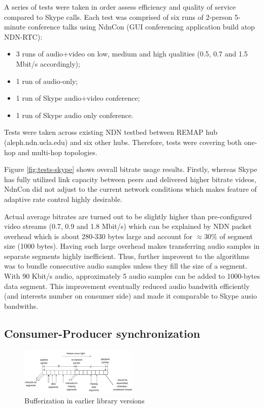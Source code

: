 \documentclass{icn/sig-alternate-2012} %
\newcommand{\ndnrtcName}{NDN-RTC} %
\begin{document}
A series of tests were taken in order assess efficiency and quality of service compared to Skype calls. Each test was comprised of six runs of 2-person 5-minute conference talks using NdnCon (GUI conferencing application build atop \ndnrtcName{}):
\begin{itemize}
\item 3 runs of audio+video on low, medium and high qualities (0.5, 0.7 and 1.5 Mbit/s accordingly);
\item 1 run of audio-only;
\item 1 run of Skype audio+video conference;
\item 1 run of Skype audio only conference.
\end{itemize}

Tests were taken across existing NDN testbed between REMAP hub (aleph.ndn.ucla.edu) and six other hubs. Therefore, tests were covering both one-hop and multi-hop topologies.

Figure \ref{fig:tests-skype} shows overall bitrate usage results. Firstly, whereas Skype has fully utilized link capacity between peers and delivered higher bitrate videos, NdnCon did not adjust to the current network conditions which makes feature of adaptive rate control highly desirable.

Actual average bitrates are turned out to be slightly higher than pre-configured video streams (0.7, 0.9 and 1.8 Mbit/s) which can be explained by NDN packet overhead which is about 280-330 bytes large and account for $\approx$30\% of segment size (1000 bytes). Having such large overhead makes transferring audio samples in separate segments highly inefficient. Thus, further improvent to the algorithms was to bundle consecutive audio samples unless they fill the size of a segment. With 90 Kbit/s audio, approximately 5 audio samples can be added to 1000-bytes data segment. This improvement eventually reduced audio bandwith efficiently (and interests number on consumer side) and made it comparable to Skype ausio bandwiths.

\subsection{Consumer-Producer synchronization}

\begin{figure}[t!]
\centering
\includegraphics[width=0.5\textwidth]{buffer}
\caption{Bufferization in earlier library versions}
\label{fig:old-buf}
\end{figure}
\end{document}
